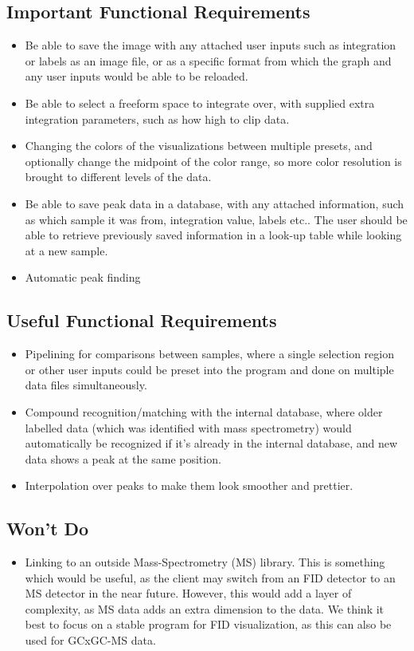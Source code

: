\documentclass{article}
\begin{document}
\subsection*{Important Functional Requirements}
\begin{itemize}
    \item Be able to save the image with any attached user inputs such as integration or labels as an image file, or as a specific format from which the graph and any user inputs would be able to be reloaded. 
	\item Be able to select a freeform space to integrate over, with supplied extra integration parameters, such as how high to clip data.
	\item Changing the colors of the visualizations between multiple presets, and optionally change the midpoint of the color range, so more color resolution is brought to different levels of the data. 
    \item Be able to save peak data in a database, with any attached information, such as which sample it was from, integration value, labels etc.. The user should be able to retrieve previously saved information in a look-up table while looking at a new sample.
	\item Automatic peak finding
\end{itemize}

\subsection*{Useful Functional Requirements}
\begin{itemize}
	\item Pipelining for comparisons between samples, where a single selection region or other user inputs could be preset into the program and done on multiple data files simultaneously.
	\item Compound recognition/matching with the internal database, where older labelled data (which was identified with mass spectrometry) would automatically be recognized if it's already in the internal database, and new data shows a peak at the same position.
	\item Interpolation over peaks to make them look smoother and prettier.  
\end{itemize}
\subsection*{Won't Do}
\begin{itemize}
	\item Linking to an outside Mass-Spectrometry (MS) library. This is something which would be useful, as the client may switch from an FID detector to an MS detector in the near future. However, this would add a layer of complexity, as MS data adds an extra dimension to the data. We think it best to focus on a stable program for FID visualization, as this can also be used for GCxGC-MS data. 
\end{itemize}
\end{document}
